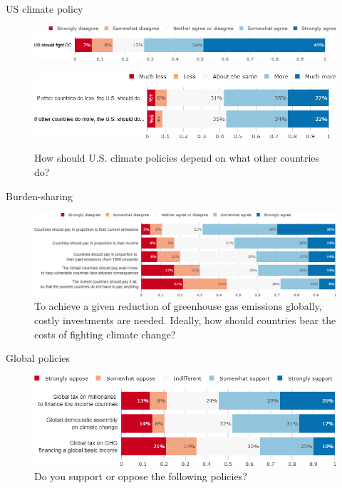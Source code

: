 \documentclass[aspectratio=169,9pt,dvipsnames]{beamer}
\begin{document}
\begin{frame}{US climate policy}%
\begin{figure}[h!]
\centering
\caption{Do you agree or disagree with the following statement: ``The U.S. should take measures to fight climate change."}
\includegraphics[width=1\textwidth]{../figures/US/should_fight_CC_US.png} \\
\vspace{1cm}
\caption{How should U.S. climate policies depend on what other countries do?}
\includegraphics[width=1\textwidth]{../figures/US/if_other_do_US.png} \\
\end{figure}
\end{frame}


\begin{frame}{Burden-sharing}%
\begin{figure}[h!]
\centering
\caption{To achieve a given reduction of greenhouse gas emissions globally, costly investments are needed.
Ideally, how should countries bear the costs of fighting climate change?}
\vspace{2mm}
\includegraphics[width=\textwidth]{../figures/US/burden_sharing_US.png}
\end{figure}
\end{frame}

\begin{frame}{Global policies}%
\begin{figure}[h!]
\centering
\caption{Do you support or oppose the following policies?}
\vspace{2mm}
\includegraphics[width=\textwidth]{../figures/US/global_policies_US.png}
\end{figure}
\end{frame}
\end{document}
